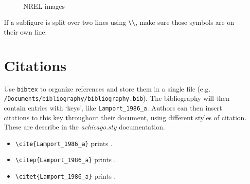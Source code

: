 \begin{figure}[htp]
\centering
\hfill
{}
~ %
\hfill
{}
\hfill
\caption{NREL images}\label{fig:NRELimages}
\end{figure}

If a subfigure is split over two lines using \verb+\\+, make sure those symbols are on their own line.

\section{Citations}
\label{Sec:Bib}
Use \texttt{bibtex} to organize references and store them in a single file (e.g. \verb+/Documents/bibliography/bibliography.bib+). The bibliography will then contain entries with `keys', like \texttt{Lamport\_1986\_a}. Authors can then insert citations to this key throughout their document, using different styles of citation. These are describe in the \emph{achicago.sty} documentation.
\begin{itemize}
\item \verb+\cite{Lamport_1986_a}+ prints \cite{Lamport_1986_a}.
\item \verb+\citep{Lamport_1986_a}+ prints \citep{Lamport_1986_a}.
\item \verb+\citet{Lamport_1986_a}+ prints \citet{Lamport_1986_a}.
\end{itemize}

